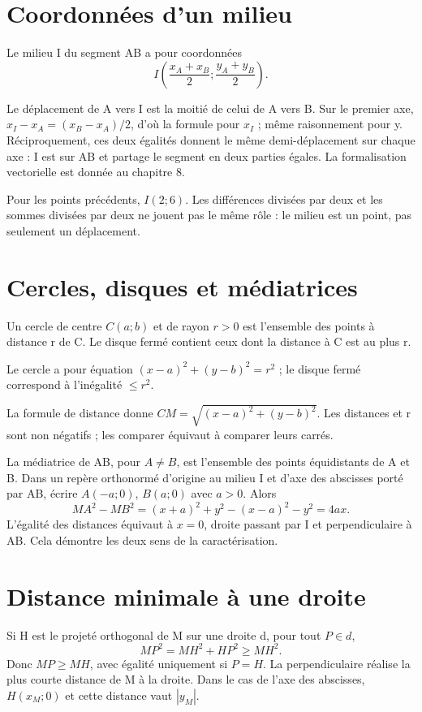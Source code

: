 \documentclass[../cours_2de.tex]{subfiles}
\begin{document}
\section{Coordonnées d'un milieu}
\begin{propriete}
Le milieu I du segment AB a pour coordonnées
\[
I\left(\frac{x_A+x_B}{2};\frac{y_A+y_B}{2}\right).
\]
\end{propriete}
\begin{demonstration}
Le déplacement de A vers I est la moitié de celui de A vers B. Sur le premier axe, $x_I-x_A=(x_B-x_A)/2$, d'où la formule pour $x_I$ ; même raisonnement pour y. Réciproquement, ces deux égalités donnent le même demi-déplacement sur chaque axe : I est sur AB et partage le segment en deux parties égales. La formalisation vectorielle est donnée au chapitre 8.
\end{demonstration}
Pour les points précédents, $I(2;6)$. Les différences divisées par deux et les sommes divisées par deux ne jouent pas le même rôle : le milieu est un point, pas seulement un déplacement.
\section{Cercles, disques et médiatrices}
Un cercle de centre $C(a;b)$ et de rayon $r>0$ est l'ensemble des points à distance r de C. Le disque fermé contient ceux dont la distance à C est au plus r.
\begin{propriete}
Le cercle a pour équation $(x-a)^2+(y-b)^2=r^2$ ; le disque fermé correspond à l'inégalité $\le r^2$.
\end{propriete}
\begin{demonstration}
La formule de distance donne $CM=\sqrt{(x-a)^2+(y-b)^2}$. Les distances et r sont non négatifs ; les comparer équivaut à comparer leurs carrés.
\end{demonstration}
La médiatrice de AB, pour $A\ne B$, est l'ensemble des points équidistants de A et B. Dans un repère orthonormé d'origine au milieu I et d'axe des abscisses porté par AB, écrire $A(-a;0)$, $B(a;0)$ avec $a>0$. Alors
\[
MA^2-MB^2=(x+a)^2+y^2-(x-a)^2-y^2=4ax.
\]
L'égalité des distances équivaut à $x=0$, droite passant par I et perpendiculaire à AB. Cela démontre les deux sens de la caractérisation.
\section{Distance minimale à une droite}
Si H est le projeté orthogonal de M sur une droite d, pour tout $P\in d$,
\[
MP^2=MH^2+HP^2\ge MH^2.
\]
Donc $MP\ge MH$, avec égalité uniquement si $P=H$. La perpendiculaire réalise la plus courte distance de M à la droite. Dans le cas de l'axe des abscisses, $H(x_M;0)$ et cette distance vaut $|y_M|$.
\end{document}
